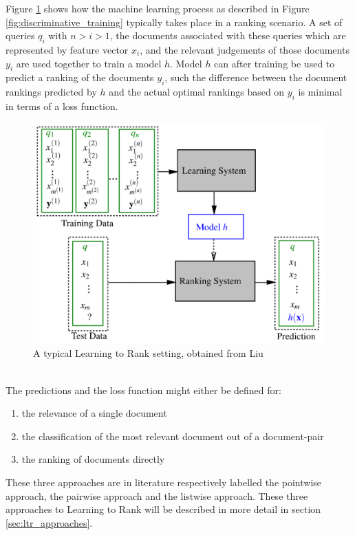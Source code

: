 Figure \ref{fig:ltr_framework} shows how the machine learning process as described in Figure \ref{fig:discriminative_training} typically takes place in a ranking scenario. A set of queries $q_i$ with $n > i > 1$, the documents associated with these queries which are represented by feature vector $x_i$, and the relevant judgements of those documents $y_i$ are used together to train a model $h$. Model $h$ can after training be used to predict a ranking of the documents $y_i$, such the difference between the document rankings predicted by $h$ and the actual optimal rankings based on $y_i$ is minimal in terms of a loss function.
\begin{figure}[!h]
\includegraphics[scale=0.25]{gfx/ltr_framework}
\caption{A typical Learning to Rank setting, obtained from Liu \cite{Liu2007}}
\label{fig:ltr_framework}
\end{figure}\\

The predictions and the loss function might either be defined for:
\begin{enumerate}
\item the relevance of a single document
\item the classification of the most relevant document out of a document-pair
\item the ranking of documents directly
\end{enumerate}
\smallskip
These three approaches are in literature respectively labelled the pointwise approach, the pairwise approach and the listwise approach. These three approaches to Learning to Rank will be described in more detail in section \ref{sec:ltr_approaches}.

